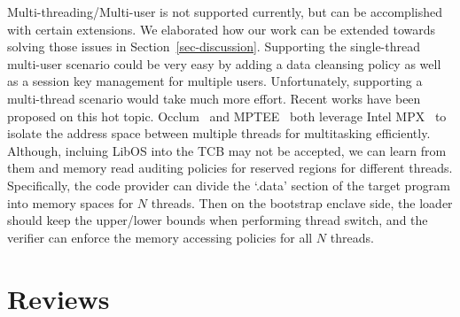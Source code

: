 Multi-threading/Multi-user is not supported currently, but can be accomplished with certain extensions. We elaborated how our work can be extended towards solving those issues in Section~\ref{sec-discussion}. Supporting the single-thread multi-user scenario could be very easy by adding a data cleansing policy as well as a session key management for multiple users. Unfortunately, supporting a multi-thread scenario would take much more effort. 
Recent works have been proposed on this hot topic. Occlum~\cite{shen2020occlum} and MPTEE~\cite{zhao2020mptee} both leverage Intel MPX~\cite{shen2018isolate} to isolate the address space between multiple threads for multitasking efficiently. Although, incluing LibOS into the TCB may not be accepted, we can learn from them and  memory read auditing policies for reserved regions for different threads. Specifically, the code provider can divide the `.data' section of the target program into memory spaces for $N$ threads.
Then on the bootstrap enclave side, the loader should keep the upper/lower bounds when performing thread switch, and the verifier can enforce the memory accessing policies for all $N$ threads.



\section{Reviews}

